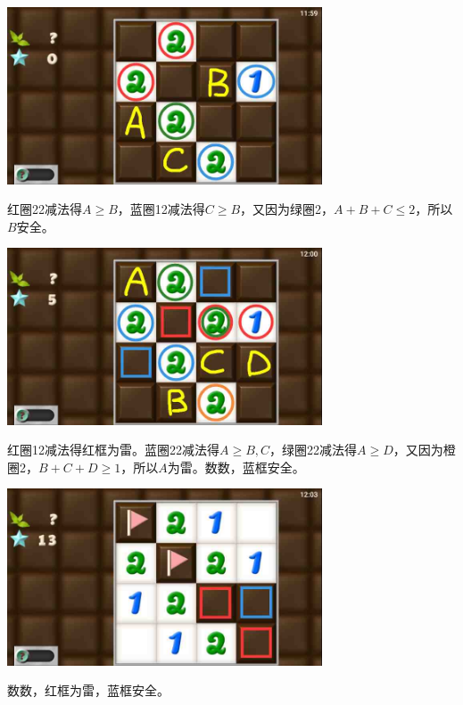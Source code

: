 \subsection{} %
\begin{center}
    \includegraphics[width=0.7\textwidth]{puzzlelow/171-1.jpg}
\end{center}
红圈22减法得$A\ge B$，蓝圈12减法得$C\ge B$，又因为绿圈2，$A+B+C\le 2$，所以$B$安全。
\begin{center}
    \includegraphics[width=0.7\textwidth]{puzzlelow/171-2.jpg}
\end{center}
红圈12减法得红框为雷。蓝圈22减法得$A\ge B,C$，绿圈22减法得$A\ge D$，又因为橙圈2，$B+C+D\ge 1$，所以$A$为雷。数数，蓝框安全。
\begin{center}
    \includegraphics[width=0.7\textwidth]{puzzlelow/171-3.jpg}
\end{center}
数数，红框为雷，蓝框安全。

